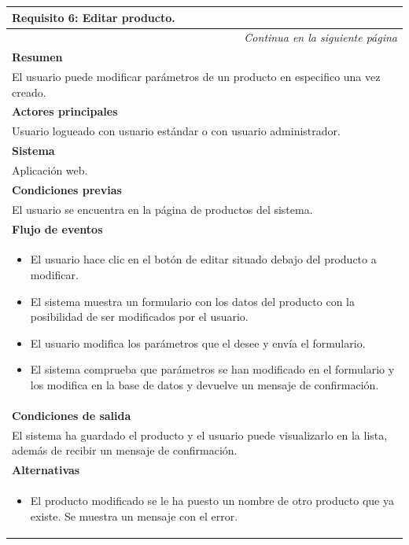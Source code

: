 \begin{longtable}{|p{}|}
\hline
 \rowcolor[gray]{.5}
 \color{white}\textbf{Requisito 6: Editar producto.} \\
\hline
\endfirsthead
\endhead
\hline \multicolumn{1}{r}{\textit{Continua en la siguiente página}} \\
\endfoot
\endlastfoot
    \rowcolor[gray]{.9}
     \textbf{Resumen} \\
     \hline
     El usuario puede modificar parámetros de un producto en especifico una vez creado. \\
     \hline
     \rowcolor[gray]{.9}
     \textbf{Actores principales} \\
     \hline
     Usuario logueado con usuario estándar o con usuario administrador. \\
     \hline
     \rowcolor[gray]{.9}
     \textbf{Sistema} \\
     \hline
     Aplicación web. \\
     \hline
     \rowcolor[gray]{.9}
     \textbf{Condiciones previas} \\
     \hline
     El usuario se encuentra en la página de productos del sistema. \\
     \hline
     \rowcolor[gray]{.9}
     \textbf{Flujo de eventos}  \\
     \hline
      \begin{itemize}
         \item El usuario hace clic en el botón de editar situado debajo del producto a modificar.
         \item El sistema muestra un formulario con los datos del producto con la posibilidad de ser modificados por el usuario.
         \item El usuario modifica los parámetros que el desee y envía el formulario.
         \item El sistema comprueba que parámetros se han modificado en el formulario y los modifica en la base de datos y devuelve un mensaje de confirmación.
     \end{itemize} \\
     \hline
     \rowcolor[gray]{.9}
     \textbf{Condiciones de salida} \\
     \hline
     El sistema ha guardado el producto y el usuario puede visualizarlo en la lista, además de recibir un mensaje de confirmación. \\
     \hline
     \rowcolor[gray]{.9}
     \textbf{Alternativas}  \\
     \hline
      \begin{itemize}
         \item El producto modificado se le ha puesto un nombre de otro producto que ya existe. Se muestra un mensaje con el error.
     \end{itemize} \\
     \hline
\end{longtable}

